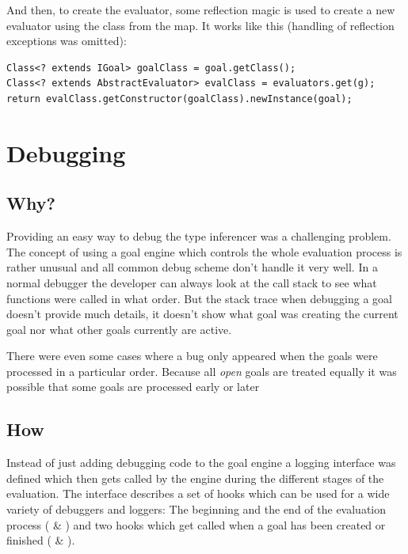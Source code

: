 \documentclass[12pt,halfparskip,DIV11,BCOR10mm]{scrreprt}
\begin{document}
And then, to create the evaluator, some reflection magic is used to create a new evaluator using the class from the map. It works like this (handling of reflection exceptions was omitted):

\begin{lstlisting}[style=java]
Class<? extends IGoal> goalClass = goal.getClass();
Class<? extends AbstractEvaluator> evalClass = evaluators.get(g);
return evalClass.getConstructor(goalClass).newInstance(goal);
\end{lstlisting}


\section{Debugging}

\subsection{Why?}

Providing an easy way to debug the type inferencer was a challenging problem. The concept of using a goal engine which controls the whole evaluation process is rather unusual and all common debug scheme don't handle it very well. In a normal debugger the developer can always look at the call stack to see what functions were called in what order. But the stack trace when debugging a goal doesn't provide much details, it doesn't show what goal was creating the current goal nor what other goals currently are active.

There were even some cases where a bug only appeared when the goals were processed in a particular order. Because all \emph{open} goals are treated equally it was possible that some goals are processed early or later

\subsection{How}


Instead of just adding debugging code to the goal engine a logging interface was defined which then gets called by the engine during the different stages of the evaluation. The interface  describes a set of hooks which can be used for a wide variety of debuggers and loggers: The beginning and the end of the evaluation process ( \& ) and two hooks which get called when a goal has been created or finished ( \& ).
\end{document}
